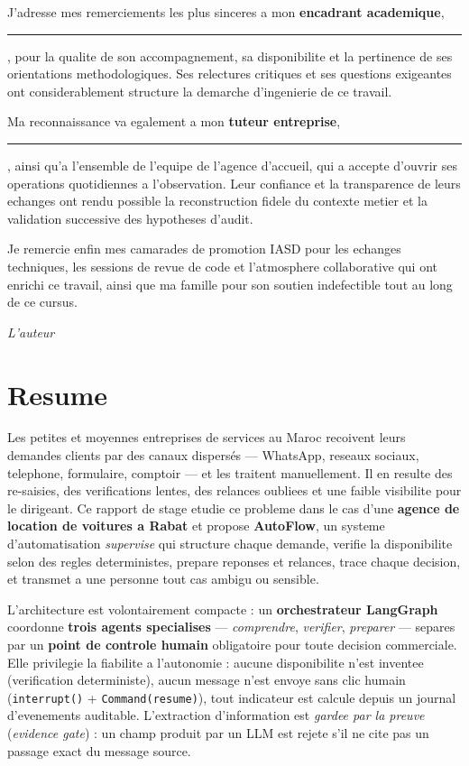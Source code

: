 \documentclass[12pt,a4paper,openany]{report}
\begin{document}
J'adresse mes remerciements les plus sinceres a mon \textbf{encadrant academique}, \rule{4cm}{0.4pt}, pour la qualite de son accompagnement, sa disponibilite et la pertinence de ses orientations methodologiques. Ses relectures critiques et ses questions exigeantes ont considerablement structure la demarche d'ingenierie de ce travail.

Ma reconnaissance va egalement a mon \textbf{tuteur entreprise}, \rule{4cm}{0.4pt}, ainsi qu'a l'ensemble de l'equipe de l'agence d'accueil, qui a accepte d'ouvrir ses operations quotidiennes a l'observation. Leur confiance et la transparence de leurs echanges ont rendu possible la reconstruction fidele du contexte metier et la validation successive des hypotheses d'audit.

Je remercie enfin mes camarades de promotion IASD pour les echanges techniques, les sessions de revue de code et l'atmosphere collaborative qui ont enrichi ce travail, ainsi que ma famille pour son soutien indefectible tout au long de ce cursus.

\vfill
\begin{flushright}
\textit{L'auteur}
\end{flushright}

\chapter*{Resume}

Les petites et moyennes entreprises de services au Maroc recoivent leurs demandes clients par des canaux dispersés --- WhatsApp, reseaux sociaux, telephone, formulaire, comptoir --- et les traitent manuellement. Il en resulte des re-saisies, des verifications lentes, des relances oubliees et une faible visibilite pour le dirigeant. Ce rapport de stage etudie ce probleme dans le cas d'une \textbf{agence de location de voitures a Rabat} et propose \textbf{AutoFlow}, un systeme d'automatisation \emph{supervise} qui structure chaque demande, verifie la disponibilite selon des regles deterministes, prepare reponses et relances, trace chaque decision, et transmet a une personne tout cas ambigu ou sensible.

L'architecture est volontairement compacte : un \textbf{orchestrateur LangGraph} coordonne \textbf{trois agents specialises} --- \emph{comprendre}, \emph{verifier}, \emph{preparer} --- separes par un \textbf{point de controle humain} obligatoire pour toute decision commerciale. Elle privilegie la fiabilite a l'autonomie : aucune disponibilite n'est inventee (verification deterministe), aucun message n'est envoye sans clic humain (\texttt{interrupt()} + \texttt{Command(resume)}), tout indicateur est calcule depuis un journal d'evenements auditable. L'extraction d'information est \emph{gardee par la preuve} (\emph{evidence gate}) : un champ produit par un LLM est rejete s'il ne cite pas un passage exact du message source.
\end{document}
